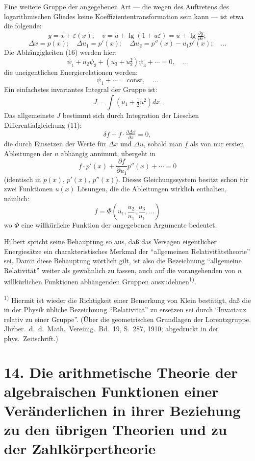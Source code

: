 \documentclass[12pt,a4paper]{article}
\begin{document}
Eine weitere Gruppe der angegebenen Art --- die wegen des Auftretens des logarithmischen Gliedes keine Koeffiziententransformation sein kann --- ist etwa die folgende:
\[
y=x+\varepsilon(x);\quad v=u+\lg(1+u\varepsilon)=u+\lg\tfrac{\partial y}{\partial x};
\]
\[
\Delta x=p(x);\quad\Delta u_{1}=p'(x);\quad\Delta u_{2}=p''(x)-u_{1}p'(x);\quad\ldots
\]
Die Abh\"angigkeiten (16) werden hier:
\[
\psi_{1}+u_{2}\psi_{2}+(u_{3}+u_{2}^{2})\psi_{3}+\cdots=0,\quad\ldots
\]
die uneigentlichen Energierelationen werden:
\[
\psi_{1}+\cdots=\mathrm{const},\quad\ldots
\]
Ein einfachstes invariantes Integral der Gruppe ist:
\[
J=\int\left(u_{1}+\tfrac{1}{2}u^{2}\right)dx.
\]
Das allgemeinste $J$ bestimmt sich durch Integration der Lieschen Differentialgleichung (11):
\[
\delta f+f\cdot\tfrac{\partial\Delta x}{\partial x}=0,
\]
die durch Einsetzen der Werte f\"ur $\Delta x$ und $\Delta u$, sobald man $f$ als von nur ersten Ableitungen der $u$ abh\"angig annimmt, \"ubergeht in
\[
f\cdot p'(x)+\frac{\partial f}{\partial u_{1}}p''(x)+\cdots=0
\]
(identisch in $p(x)$, $p'(x)$, $p''(x)$). Dieses Gleichungssystem besitzt schon f\"ur zwei Funktionen $u(x)$ L\"osungen, die die Ableitungen wirklich enthalten, n\"amlich:
\[
f=\varPhi\left(u_{1},\frac{u_{2}}{u_{1}},\frac{u_{3}}{u_{1}},\ldots\right)
\]
wo $\varPhi$ eine willk\"urliche Funktion der angegebenen Argumente bedeutet.

Hilbert spricht seine Behauptung so aus, da\ss{} das Versagen eigentlicher Energies\"atze ein charakteristisches Merkmal der ``allgemeinen Relativit\"atstheorie'' sei. Damit diese Behauptung w\"ortlich gilt, ist also die Bezeichnung ``allgemeine Relativit\"at'' weiter als gew\"ohnlich zu fassen, auch auf die vorangehenden von $n$ willk\"urlichen Funktionen abh\"angenden Gruppen auszudehnen\textsuperscript{1)}.

\smallskip
\noindent\textsuperscript{1)} Hiermit ist wieder die Richtigkeit einer Bemerkung von Klein best\"atigt, da\ss{} die in der Physik \"ubliche Bezeichnung ``Relativit\"at'' zu ersetzen sei durch ``Invarianz relativ zu einer Gruppe''. (\"Uber die geometrischen Grundlagen der Lorentzgruppe. Jhrber.\ d.\ d.\ Math.\ Vereinig.\ Bd.\ 19, S.\ 287, 1910; abgedruckt in der phys.\ Zeitschrift.)

\newpage

\section*{14. Die arithmetische Theorie der algebraischen Funktionen einer Ver\"anderlichen in ihrer Beziehung zu den \"ubrigen Theorien und zu der Zahlk\"orpertheorie}
\end{document}
